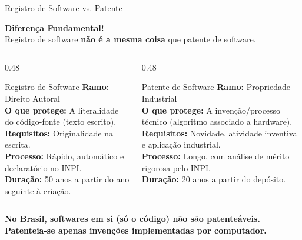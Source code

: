 \documentclass[9pt]{beamer}
\begin{document}
\begin{frame}{Registro de Software vs. Patente}
  \begin{center}
    \large\color{mRed}\textbf{Diferença Fundamental!}\\
    \small Registro de software \textbf{não é a mesma coisa} que patente de software.
  \end{center}
  
  \vspace{0.2cm}
  
  \begin{columns}[T]
    \begin{column}{0.48\textwidth}
      \begin{block}{Registro de Software}
        \small
        \textbf{Ramo:} Direito Autoral\\
        \textbf{O que protege:} A literalidade do código-fonte (texto escrito).\\
        \textbf{Requisitos:} Originalidade na escrita.\\
        \textbf{Processo:} Rápido, automático e declaratório no INPI.\\
        \textbf{Duração:} 50 anos a partir do ano seguinte à criação.
      \end{block}
    \end{column}
    
    \begin{column}{0.48\textwidth}
      \begin{block}{Patente de Software}
        \small
        \textbf{Ramo:} Propriedade Industrial\\
        \textbf{O que protege:} A invenção/processo técnico (algoritmo associado a hardware).\\
        \textbf{Requisitos:} Novidade, atividade inventiva e aplicação industrial.\\
        \textbf{Processo:} Longo, com análise de mérito rigorosa pelo INPI.\\
        \textbf{Duração:} 20 anos a partir do depósito.
      \end{block}
    \end{column}
  \end{columns}
  
  \vspace{0.15cm}
  \begin{center}
    \scriptsize\color{structure.fg}\bfseries No Brasil, softwares em si (só o código) não são patenteáveis. Patenteia-se apenas invenções implementadas por computador.
  \end{center}
\end{frame}
\end{document}
